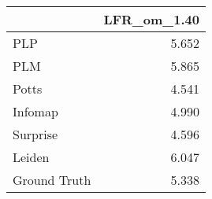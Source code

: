 \begin{tabular}{lr}
\toprule
{} & LFR_om_1.40 \\
\midrule
PLP          &       5.652 \\
PLM          &       5.865 \\
Potts        &       4.541 \\
Infomap      &       4.990 \\
Surprise     &       4.596 \\
Leiden       &       6.047 \\
Ground Truth &       5.338 \\
\bottomrule
\end{tabular}
